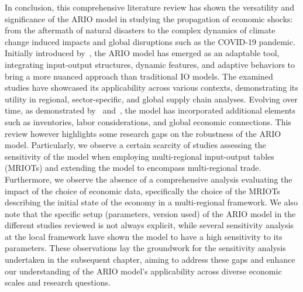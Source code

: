 In conclusion, this comprehensive literature review has shown the
versatility and significance of the ARIO model in studying the propagation of
economic shocks: from the aftermath of natural disasters to the complex dynamics of
climate change induced impacts and global disruptions such as the COVID-19
pandemic. Initially
introduced by~\textcite{hallegatte-2008-adapt-region}, the ARIO
model has emerged as an adaptable tool, integrating input-output
structures, dynamic features, and adaptive behaviors to bring a more nuanced
approach than traditional IO models. The examined studies have showcased its
applicability across various contexts, demonstrating its utility in regional,
sector-specific, and global supply chain analyses. Evolving over time, as
demonstrated by~\textcite{hallegatte-2013-model-role}
and~\textcite{guan-2020-global-suppl}, the model has
incorporated additional elements such as inventories, labor considerations, and
global economic connections. This review however highlights some research gaps
on the robustness of the ARIO model. Particularly, we observe a certain scarcity
of studies assessing the sensitivity of the model when employing multi-regional
input-output tables (MRIOTs) and extending the model to encompass multi-regional
trade. Furthermore, we observe the absence of a
comprehensive analysis evaluating the impact of the choice of economic data,
specifically the choice of the MRIOTs describing the initial state of the
economy in a multi-regional framework. We also note that the specific setup
(parameters, version used) of the ARIO model in the different studies reviewed
is not always explicit, while several sensitivity analysis at the local
framework have shown the model to have a high sensitivity to its parameters.
These observations lay the groundwork for the sensitivity analysis undertaken in
the subsequent chapter, aiming to address these gaps and enhance our
understanding of the ARIO model's applicability across diverse economic scales
and research questions.

